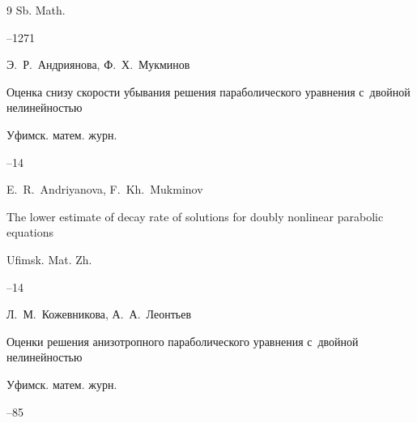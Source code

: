 \begin{thebibliography}{9}
\jour Sb. Math.




--1271










\by Э.~Р.~Андриянова, Ф.~Х.~Мукминов

\paper Оценка снизу скорости убывания решения параболического уравнения с~двойной нелинейностью

\jour Уфимск. матем. журн.




--14


\misctransl

\by E.~R.~Andriyanova, F.~Kh.~Mukminov

\paper The lower estimate of decay rate of solutions for doubly nonlinear parabolic equations

\jour Ufimsk. Mat. Zh.




--14










\by Л.~М.~Кожевникова, А.~А.~Леонтьев

\paper Оценки решения анизотропного параболического уравнения с~двойной нелинейностью

\jour Уфимск. матем. журн.




--85



\end{thebibliography}
